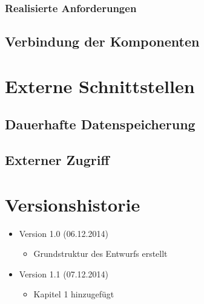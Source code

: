 \documentclass[11pt]{article}
\begin{document}
\subsubsection{Realisierte Anforderungen}

\subsection{Verbindung der Komponenten}

\section{Externe Schnittstellen}

\subsection{Dauerhafte Datenspeicherung}

\subsection{Externer Zugriff}

\section{Versionshistorie}

\begin{itemize}
	\item Version 1.0 (06.12.2014)
	\begin{itemize}
		\item Grundstruktur des Entwurfs erstellt
	\end{itemize}
	\item Version 1.1 (07.12.2014)
	\begin{itemize}
		\item Kapitel 1 hinzugefügt
	\end{itemize}
\end{itemize}
\end{document}
